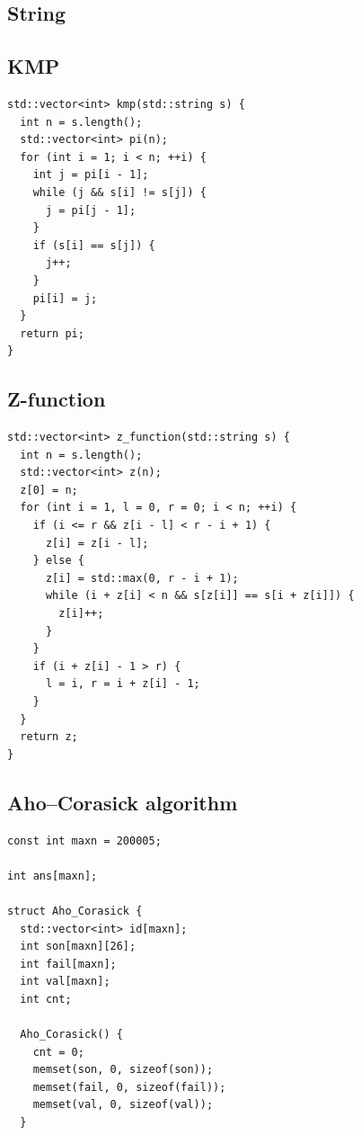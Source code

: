 \documentclass[9pt,landscape]{article}
\begin{document}
\begin{multicols}{2}

\columnseprule=0.25pt

\section{String}

\subsection{KMP}

\begin{lstlisting}
std::vector<int> kmp(std::string s) {
  int n = s.length();
  std::vector<int> pi(n);
  for (int i = 1; i < n; ++i) {
    int j = pi[i - 1];
    while (j && s[i] != s[j]) {
      j = pi[j - 1];
    }
    if (s[i] == s[j]) {
      j++;
    }
    pi[i] = j;
  }
  return pi;
}
\end{lstlisting}

\subsection{Z-function}

\begin{lstlisting}
std::vector<int> z_function(std::string s) {
  int n = s.length();
  std::vector<int> z(n);
  z[0] = n;
  for (int i = 1, l = 0, r = 0; i < n; ++i) {
    if (i <= r && z[i - l] < r - i + 1) {
      z[i] = z[i - l];
    } else {
      z[i] = std::max(0, r - i + 1);
      while (i + z[i] < n && s[z[i]] == s[i + z[i]]) {
        z[i]++;
      }
    }
    if (i + z[i] - 1 > r) {
      l = i, r = i + z[i] - 1;
    }
  }
  return z;
}
\end{lstlisting}

\subsection{Aho–Corasick algorithm}

\begin{lstlisting}
const int maxn = 200005;

int ans[maxn];

struct Aho_Corasick {
  std::vector<int> id[maxn];
  int son[maxn][26];
  int fail[maxn];
  int val[maxn];
  int cnt;

  Aho_Corasick() {
    cnt = 0;
    memset(son, 0, sizeof(son));
    memset(fail, 0, sizeof(fail));
    memset(val, 0, sizeof(val));
  }


\end{lstlisting}
\end{multicols}
\end{document}
